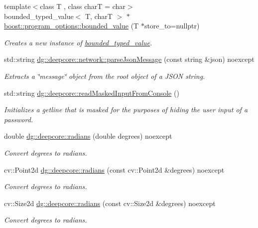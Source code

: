 \begin{DoxyCompactItemize}
{\footnotesize template$<$class T , class charT  = char$>$ }\\bounded\+\_\+typed\+\_\+value$<$ T, charT $>$ $\ast$ \hyperlink{group___utility_module_ga29195cfb403d70365c30a76867c787b5}{boost\+::program\+\_\+options\+::bounded\+\_\+value} (T $\ast$store\+\_\+to=nullptr)
\begin{DoxyCompactList}\small\item\em Creates a new instance of \hyperlink{classboost_1_1program__options_1_1bounded__typed__value}{bounded\+\_\+typed\+\_\+value}. \end{DoxyCompactList}\item 
std\+::string \hyperlink{group___utility_module_gab8f3ab23c87fe876bb3e9b76fc46fff9}{dg\+::deepcore\+::network\+::parse\+Json\+Message} (const string \&json) noexcept
\begin{DoxyCompactList}\small\item\em Extracts a \char`\"{}message\char`\"{} object from the root object of a J\+S\+ON string. \end{DoxyCompactList}\item 
std\+::string \hyperlink{group___utility_module_ga3d0cf89b2a18e61bc8c07ae4006c9744}{dg\+::deepcore\+::read\+Masked\+Input\+From\+Console} ()
\begin{DoxyCompactList}\small\item\em Initializes a getline that is masked for the purposes of hiding the user input of a password. \end{DoxyCompactList}\item 
double \hyperlink{group___utility_module_ga547c4f80c778878854c572c297cc1983}{dg\+::deepcore\+::radians} (double degrees) noexcept
\begin{DoxyCompactList}\small\item\em Convert degrees to radians. \end{DoxyCompactList}\item 
cv\+::\+Point2d \hyperlink{group___utility_module_ga8ce4d2c11e35fe075404a256c272b4d8}{dg\+::deepcore\+::radians} (const cv\+::\+Point2d \&degrees) noexcept
\begin{DoxyCompactList}\small\item\em Convert degrees to radians. \end{DoxyCompactList}\item 
cv\+::\+Size2d \hyperlink{group___utility_module_gabf4e708fbdf32c6c93035b918d7ffa03}{dg\+::deepcore\+::radians} (const cv\+::\+Size2d \&degrees) noexcept
\begin{DoxyCompactList}\small\item\em Convert degrees to radians. \end{DoxyCompactList}\item 

\end{DoxyCompactItemize}
